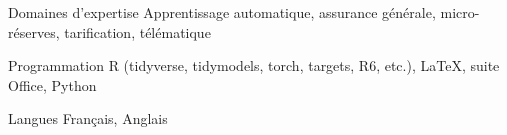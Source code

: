
\begin{cvskills}
  \cvskill
    {Domaines d'expertise} %
    {Apprentissage automatique, assurance générale, micro-réserves, tarification, télématique} %
    
  \cvskill
    {Programmation} %
    {R (tidyverse, tidymodels, torch, targets, R6, etc.), LaTeX, suite Office, Python} %
    
  \cvskill
    {Langues} %
    {Français, Anglais} %

\end{cvskills}
